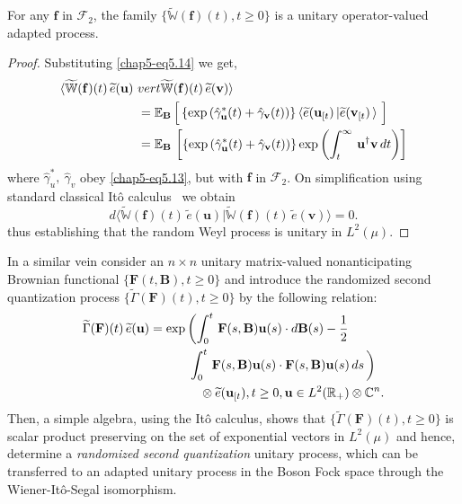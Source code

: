 \begin{thm}\label{chap5-thm1}
For any $\mathbf{f}$ in $\mathcal{F}_2$, the family  
$\{\widetilde{\mathbb{W}}(\mathbf{f})(t), t\geq 0\}$ is  a unitary operator-valued adapted process.
\end{thm}
\begin{proof}
Substituting \eqref{chap5-eq5.14} we get,  
\begin{align}
\langle \widetilde{\mathbb{W}}(\mathbf{f})(t)\, \widetilde{e}(\mathbf{u})\ & vert \widetilde{\mathbb{W}}
(\mathbf{f})(t)\, \widetilde{e}(\mathbf{v})\rangle\notag\\ 
& = \mathbb{E}_{\mathbf{B}}\, \Big[ \left\{{\exp}\left({\hat{\gamma}_\mathbf{u}^*(t)}+{\hat{\gamma}_\mathbf{v}(t)}\right) \right\}
\langle \widetilde{e}(\mathbf{u}_{[t})\,\vert  \widetilde{e}(\mathbf{v}_{[t})\,\rangle\, \, \Big] \nonumber \\
&=\mathbb{E}_{\mathbf{B}}\, \left[   \left\{{\rm exp}\left({\hat{\gamma}_\mathbf{u}^*(t)}
+{\hat{\gamma}_\mathbf{v}(t)}\right) \right\} {\rm exp}\left(\int_t^\infty\, \mathbf{u}^\dag\mathbf{v}\, dt\right)\right]
\end{align}
where $\hat{\gamma}_u^*,\ \hat{\gamma}_v$ obey \eqref{chap5-eq5.13}, but with  $\mathbf{f}$ in $\mathcal{F}_2$.  On simplification using standard classical It{\^o} calculus~\cite{key38} we obtain  
\begin{equation}
d\langle \widetilde{\mathbb{W}}(\mathbf{f})(t)\, \widetilde{e}(\mathbf{u})\vert \widetilde{\mathbb{W}}
(\mathbf{f})(t)\, \widetilde{e}(\mathbf{v})\rangle= 0.\label{chap5-eq5.16}
\end{equation}
thus establishing that the random Weyl process is unitary in $L^2(\mu)$.
\end{proof}

In a similar vein  consider an $n\times n$ unitary matrix-valued nonanticipating Brownian functional $\{\mathbf{F}(t,\mathbf{B}), t\geq 0\}$ and introduce the randomized second quantization process $\{\widetilde{\Gamma}(\mathbf{F})(t), t\geq 0\}$ by the following relation: 
\begin{align}
\widetilde{\Gamma}(\mathbf{F})(t)\,  \widetilde{e}(\mathbf{u}) &= {\exp}\left(\int_0^t\, \mathbf{F}(s,\mathbf{B})\mathbf{u}(s)\cdot d\mathbf{B}(s) - \frac{1}{2}\,\right. \notag \\ 
& \qquad \quad \left. \int_0^t\, \mathbf{F}(s,\mathbf{B})\mathbf{u}(s) \cdot \mathbf{F}(s,\mathbf{B})\mathbf{u}(s)\, ds\,\right)\notag \\ 
& \qquad \qquad\otimes \widetilde{e}(\mathbf{u}_{[t}), t\geq 0, \mathbf{u}\in L^2(\mathbb{R}_+)\otimes \mathbb{C}^n.  \label{chap5-eq5.17}
\end{align}
Then, a simple algebra, using the It{\^o} calculus, shows that $\{\widetilde{\Gamma}(\mathbf{F})(t), t\geq 0\}$ is scalar product preserving on the set of exponential vectors in $L^2(\mu)$ and hence, determine a {\em randomized second quantization} unitary process, which can be transferred to an adapted unitary process in the Boson Fock space through the Wiener-It{\^o}-Segal isomorphism. 

